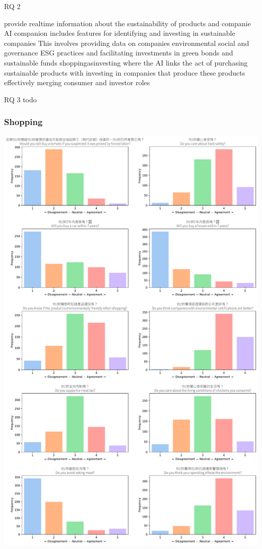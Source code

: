\documentclass[
  letterpaper,
  DIV=11,
  numbers=noendperiod]{scrartcl}
\begin{document}
RQ 2

provide realtime information about the sustainability of products and
companie AI companion includes features for identifying and investing in
sustainable companies This involves providing data on companies
environmental social and governance ESG practices and facilitating
investments in green bonds and sustainable funds shoppingasinvesting
where the AI links the act of purchasing sustainable products with
investing in companies that produce these products effectively merging
consumer and investor roles

RQ 3 todo

\newpage

\subsubsection{Shopping}\label{shopping-1}

\includegraphics{_thesis_files/figure-pdf/cell-60-output-1.pdf}
\end{document}
